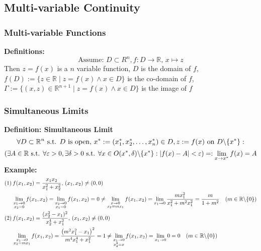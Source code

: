 \documentclass{article}
\newcommand{\R}{\mathbb{R}}
\newcommand{\st}{\mbox{ s.t. }}
\newcommand{\0}{{\bf{0}}}
\begin{document}
\subsection{Multi-variable Continuity}
\subsubsection{Multi-variable Functions}
\textbf{Definitions:}
$$\mbox{Assume: }D\subset R^n,f:D\to\R,\,x\mapsto z$$
Then $z=f(x)$ is a $n$ variable function, $D$ is the domain of $f$, $f(D):=\{z\in\R\mid z=f(x)\land x\in D\}$ is the co-domain of $f$, $\Gamma:=\{(x,z)\in\R^{n+1}\mid z=f(x)\land x\in D\}$ is the image of $f$
\subsubsection{Simultaneous Limits}
\textbf{Definition: Simultaneous Limit}
$$\forall D\subset\R^n\st D\mbox{ is open, }x^*:=(x_1^*,x_2^*,\dots,x_n^*)\in D,z:=f(x)\mbox{ on }D\symbol{92}\{x^*\}:$$
$$(\exists A\in\R\st\forall\varepsilon>0,\exists\delta>0\st\forall x\in O(x^*,\delta)\symbol{92}\{x^*\}:|f(x)-A|<\varepsilon)=:\lim_{x\to x^*}f(x)=A$$
\textbf{Example:}
\begin{equation}
\begin{split}
    (1)\,&f(x_1,x_2)=\frac{x_1x_2}{x_1^2+x_2^2},\,(x_1,x_2)\neq(0,0)\\
    &\lim_{\substack{{x_1\to0}\\{x_2=0}}}f(x_1,x_2)=\lim_{\substack{{x_2\to0}\\{x_1=0}}}f(x_1,x_2)=0\neq\lim_{
    \substack{{x\to0}\\{x_2=mx_1}}}f(x_1,x_2)=\lim_{x_1\to0}\frac{mx_1^2}{x_1^2+m^2x_1^2}=\frac{m}{1+m^2}\quad(m\in\R\symbol{92}\{0\})\\
    (2)\,&f(x_1,x_2)=\frac{(x_2^2-x_1)^2}{x_2^4+x_1^2},\,(x_1,x_2)\neq(0,0)\\
    &\lim_{\substack{{x_1\to0}\\{x_2=mx_1}}}f(x_1,x_2)=\frac{\left(m^2x_1^2-x_1\right)^2}{m^4x_1^4+x_1^2}=1\neq\lim_{\substack{{x_1\to0}\\{x_2^2=x}}}f(x_1,x_2)=\lim_{x_1\to0}0=0\quad(m\in\R\symbol{92}\{0\})
\end{split}
\end{equation}
\end{document}
